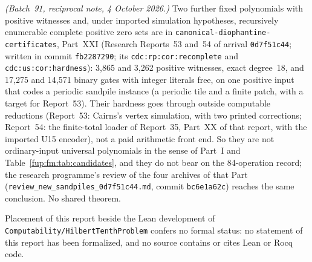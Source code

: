 \documentclass[11pt,letterpaper]{article}
\theoremstyle{definition}\newtheorem{definition}[theorem]{Definition}
\theoremstyle{remark}\newtheorem{remark}[theorem]{Remark}
\newcommand{\rw}[1]{\nolinkurl{#1}}%
\begin{document}
\emph{(Batch~91, reciprocal note, 4 October 2026.)} Two further fixed polynomials with positive witnesses and, under imported simulation hypotheses, recursively enumerable complete positive zero sets are in \rw{canonical-diophantine-certificates}, Part~XXI (Research Reports~53 and~54 of arrival \texttt{0d7f51c44}; written in commit \texttt{fb2287290}; its \rw{cdc:rp:cor:recomplete} and \rw{cdc:us:cor:hardness}): 3,865 and 3,262 positive witnesses, exact degree~18, and 17,275 and 14,571 binary gates with integer literals free, on one positive input that codes a periodic sandpile instance (a periodic tile and a finite patch, with a target for Report~53). Their hardness goes through outside computable reductions (Report~53: Cairns's vertex simulation, with two printed corrections; Report~54: the finite-total loader of Report~35, Part~XX of that report, with the imported U15 encoder), not a paid arithmetic front end. So they are not ordinary-input universal polynomials in the sense of Part~I and Table~\ref{fup:fm:tab:candidates}, and they do not bear on the 84-operation record; the research programme's review of the four archives of that Part (\rw{review_new_sandpiles_0d7f51c44.md}, commit \texttt{bc6e1a62c}) reaches the same conclusion. No shared theorem.

Placement of this report beside the Lean development of \rw{Computability/HilbertTenthProblem} confers no formal status: no statement of this report has been formalized, and no source contains or cites Lean or Rocq code.
\end{document}
